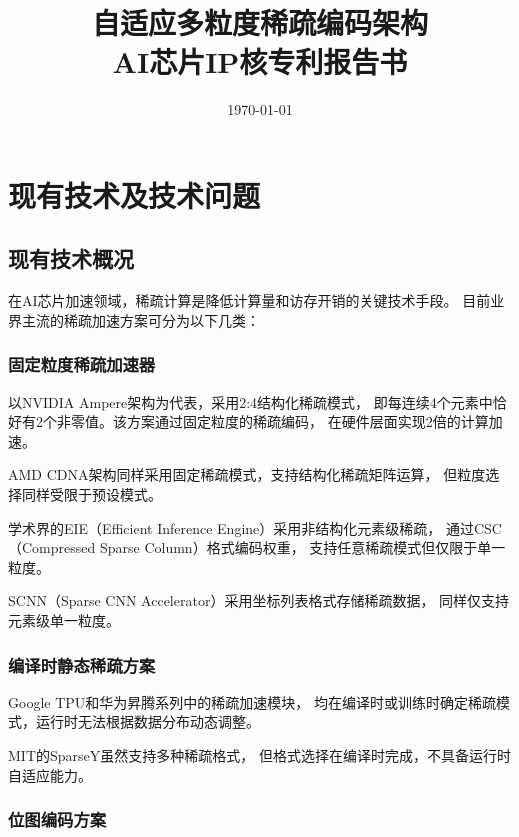 \documentclass[a4paper,12pt,fontset=ubuntu]{ctexart}
\title{\textbf{自适应多粒度稀疏编码架构\\AI芯片IP核专利报告书}}
\author{}
\date{\today}
\begin{document}
\maketitle
\thispagestyle{empty}
\newpage

\section{现有技术及技术问题}

\subsection{现有技术概况}

在AI芯片加速领域，稀疏计算是降低计算量和访存开销的关键技术手段。
目前业界主流的稀疏加速方案可分为以下几类：

\subsubsection{固定粒度稀疏加速器}

以NVIDIA Ampere架构为代表，采用2:4结构化稀疏模式，
即每连续4个元素中恰好有2个非零值。该方案通过固定粒度的稀疏编码，
在硬件层面实现2倍的计算加速。

AMD CDNA架构同样采用固定稀疏模式，支持结构化稀疏矩阵运算，
但粒度选择同样受限于预设模式。

学术界的EIE（Efficient Inference Engine）采用非结构化元素级稀疏，
通过CSC（Compressed Sparse Column）格式编码权重，
支持任意稀疏模式但仅限于单一粒度。

SCNN（Sparse CNN Accelerator）采用坐标列表格式存储稀疏数据，
同样仅支持元素级单一粒度。

\subsubsection{编译时静态稀疏方案}

Google TPU和华为昇腾系列中的稀疏加速模块，
均在编译时或训练时确定稀疏模式，运行时无法根据数据分布动态调整。

MIT的SparseY虽然支持多种稀疏格式，
但格式选择在编译时完成，不具备运行时自适应能力。

\subsubsection{位图编码方案}
\end{document}
